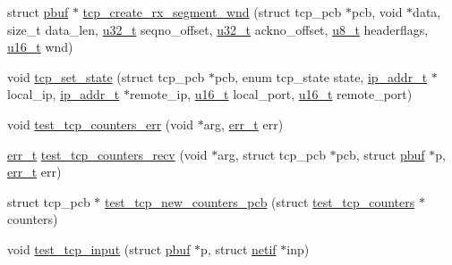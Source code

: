 \begin{DoxyCompactItemize}
\item 
struct \hyperlink{structpbuf}{pbuf} $\ast$ \hyperlink{openmote-cc2538_2lwip_2test_2unit_2tcp_2tcp__helper_8h_aa45bbb22d0e973f9af6732ac35faed68}{tcp\+\_\+create\+\_\+rx\+\_\+segment\+\_\+wnd} (struct tcp\+\_\+pcb $\ast$pcb, void $\ast$data, size\+\_\+t data\+\_\+len, \hyperlink{group__compiler__abstraction_ga4c14294869aceba3ef9d4c0c302d0f33}{u32\+\_\+t} seqno\+\_\+offset, \hyperlink{group__compiler__abstraction_ga4c14294869aceba3ef9d4c0c302d0f33}{u32\+\_\+t} ackno\+\_\+offset, \hyperlink{group__compiler__abstraction_ga4caecabca98b43919dd11be1c0d4cd8e}{u8\+\_\+t} headerflags, \hyperlink{group__compiler__abstraction_ga77570ac4fcab86864fa1916e55676da2}{u16\+\_\+t} wnd)
\item 
void \hyperlink{openmote-cc2538_2lwip_2test_2unit_2tcp_2tcp__helper_8h_a39f3f73a5ac75fb0de5253cc0a1da423}{tcp\+\_\+set\+\_\+state} (struct tcp\+\_\+pcb $\ast$pcb, enum tcp\+\_\+state state, \hyperlink{native_2lwip_2src_2include_2lwip_2ip__addr_8h_a88b43639738c4de2d3cd22e3a1fd7696}{ip\+\_\+addr\+\_\+t} $\ast$local\+\_\+ip, \hyperlink{native_2lwip_2src_2include_2lwip_2ip__addr_8h_a88b43639738c4de2d3cd22e3a1fd7696}{ip\+\_\+addr\+\_\+t} $\ast$remote\+\_\+ip, \hyperlink{group__compiler__abstraction_ga77570ac4fcab86864fa1916e55676da2}{u16\+\_\+t} local\+\_\+port, \hyperlink{group__compiler__abstraction_ga77570ac4fcab86864fa1916e55676da2}{u16\+\_\+t} remote\+\_\+port)
\item 
void \hyperlink{openmote-cc2538_2lwip_2test_2unit_2tcp_2tcp__helper_8h_a3ddbc387487935205c08c161223031c7}{test\+\_\+tcp\+\_\+counters\+\_\+err} (void $\ast$arg, \hyperlink{group__infrastructure__errors_gaf02d9da80fd66b4f986d2c53d7231ddb}{err\+\_\+t} err)
\item 
\hyperlink{group__infrastructure__errors_gaf02d9da80fd66b4f986d2c53d7231ddb}{err\+\_\+t} \hyperlink{openmote-cc2538_2lwip_2test_2unit_2tcp_2tcp__helper_8h_a6618a2d98d08a43995474cd3ef6704fc}{test\+\_\+tcp\+\_\+counters\+\_\+recv} (void $\ast$arg, struct tcp\+\_\+pcb $\ast$pcb, struct \hyperlink{structpbuf}{pbuf} $\ast$p, \hyperlink{group__infrastructure__errors_gaf02d9da80fd66b4f986d2c53d7231ddb}{err\+\_\+t} err)
\item 
struct tcp\+\_\+pcb $\ast$ \hyperlink{openmote-cc2538_2lwip_2test_2unit_2tcp_2tcp__helper_8h_a4743f4d8687063a2fc6da6d448cfcdcf}{test\+\_\+tcp\+\_\+new\+\_\+counters\+\_\+pcb} (struct \hyperlink{structtest__tcp__counters}{test\+\_\+tcp\+\_\+counters} $\ast$counters)
\item 
void \hyperlink{openmote-cc2538_2lwip_2test_2unit_2tcp_2tcp__helper_8h_a310f0aa8ac7ce26d35fd91c69ff98bda}{test\+\_\+tcp\+\_\+input} (struct \hyperlink{structpbuf}{pbuf} $\ast$p, struct \hyperlink{structnetif}{netif} $\ast$inp)

\end{DoxyCompactItemize}
